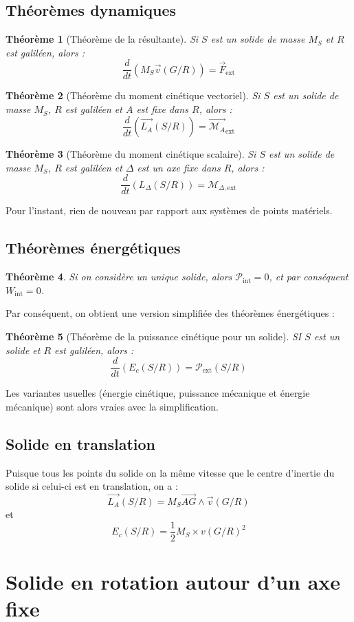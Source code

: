 \documentclass[french]{book}
\theoremstyle{plain}
\newtheorem{thm}{Théorème}
\theoremstyle{definition}
\theoremstyle{remark}
\begin{document}
\subsection{Théorèmes dynamiques}
\begin{thm}[Théorème de la résultante]
	Si $S$ est un solide de masse $M_S$ et $R$ est galiléen, alors : $$\frac{d}{dt}\left(M_S\overrightarrow{v}(G/R)\right)=\overrightarrow{F}_{\text{ext}}$$
\end{thm}
\begin{thm}[Théorème du moment cinétique vectoriel]
	Si $S$ est un solide de masse $M_S$, $R$ est galiléen et $A$ est fixe dans $R$, alors : $$\frac{d}{dt}\left(\overrightarrow{L_A}(S/R)\right)=\overrightarrow{\mathcal{M}_A}_{\text{ext}}$$
\end{thm}
\begin{thm}[Théorème du moment cinétique scalaire]
	Si $S$ est un solide de masse $M_S$, $R$ est galiléen et $\Delta$ est un axe fixe dans $R$, alors : $$\frac{d}{dt}\left(L_\Delta(S/R)\right)=\mathcal{M}_{\Delta,\text{ext}}$$
\end{thm}
Pour l'instant, rien de nouveau par rapport aux systèmes de points matériels.
\subsection{Théorèmes énergétiques}
\begin{thm}
	Si on considère un unique solide, alors $\mathcal{P}_{\text{int}}=0$, et par conséquent $W_{\text{int}}=0$.
\end{thm}
Par conséquent, on obtient une version simplifiée des théorèmes énergétiques : 
\begin{thm}[Théorème de la puissance cinétique pour un solide]
	SI $S$ est un solide et $R$ est galiléen, alors : $$\frac{d}{dt}\left(E_c(S/R)\right)=\mathcal{P}_{\text{ext}}(S/R)$$
\end{thm}
Les variantes usuelles (énergie cinétique, puissance mécanique et énergie mécanique) sont alors vraies avec la simplification.
\subsection{Solide en translation}
Puisque tous les points du solide on la même vitesse que le centre d'inertie du solide si celui-ci est en translation, on a : $$\overrightarrow{L_A}(S/R)=M_S\overrightarrow{AG}\wedge\overrightarrow{v}(G/R)$$ et $$E_c(S/R)=\frac{1}{2}M_S\times v(G/R)^2$$
\section{Solide en rotation autour d'un axe fixe}
\end{document}
